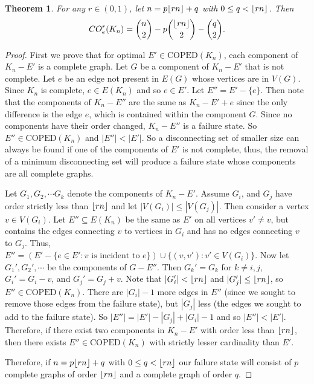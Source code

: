\documentclass[12pt]{article}
\DeclarePairedDelimiter{\floor}{\lfloor}{\rfloor}
\newtheorem{theorem}{Theorem}[section]
\theoremstyle{definition}
\newcommand{\COEDS}{\text{COPED}}
\newcommand{\COE}[2]{CO^{#1}_{e}(#2)}
\begin{document}
\begin{theorem}
For any $r \in (0,1)$, let $n=p\floor{rn}+q$ with $0\leq q < \floor{rn}$. Then
$$\COE{r}{K_{n}}=\binom{n}{2}-p\binom{\floor{rn}}{2} - \binom{q}{2}.$$
\end{theorem}
\begin{proof}

First we prove that for optimal $E'\in \COEDS(K_{n})$, each component of $K_{n}-E'$ is a complete graph. Let $G$ be a component of $K_{n}-E'$ that is not complete. Let $e$ be an edge not present in $E(G)$ whose vertices are in $V(G)$. Since $K_{n}$ is complete, $e\in E(K_{n})$ and so $e\in E'$. Let $E''=E'-\{e\}$. Then note that the components of $K_{n}-E''$ are the same as $K_{n}-E'+e$ since the only difference is the edge $e$, which is contained within the component $G$. Since no components have their order changed, $K_{n}-E''$ is a failure state. So $E''\in \COEDS(K_{n})$ and $|E''|<|E'|$. So a disconnecting set of smaller size can always be found if one of the components of $E'$ is not complete, thus, the removal of a minimum disconnecting set will produce a failure state whose components are all complete graphs. 


Let $G_{1},G_{2},\cdots G_{k}$ denote the components of $K_{n}-E'$. Assume $G_{i}$, and $G_{j}$ have order strictly less than $\floor{rn}$ and let $|V(G_i)|\le |V(G_j)|$. Then consider a vertex $v\in V(G_{i})$. Let $E''\subseteq E(K_{n})$ be the same as $E'$ on all vertices $v'\ne v$, but contains the edges connecting $v$ to vertices in $G_i$ and has no edges connecting $v$ to $G_j$. Thus,\\
$E'' = \left(E'-\{e\in E': v \text{ is incident to } e\}\right) \cup \{(v, v'): v' \in V(G_i)\}$.  Now let $G_1',G_2',\cdots$ be the components of $G-E''$. Then $G_k'=G_k$ for $k\ne i,j$,$G_i' = G_i - v$, and $G_j' = G_j + v$. Note that $|G_{i}'|< \floor{rn}$ and $|G_{j}'|\le \floor{rn}$, so $E''\in \COEDS(K_{n})$.
There are $|G_i|-1$ more edges in $E''$ (since we sought to remove those edges from the failure state), but $|G_j|$ less (the edges we sought to add to the failure state). So $|E''| = |E'|-|G_j|+|G_i|-1$ and so $|E''| < |E'|$. Therefore, if there exist two components in $K_{n}-E'$ with order less than $\floor{rn}$, then there exists $E''\in \COEDS(K_{n})$ with strictly lesser cardinality than $E'$.  



Therefore, if $n=p\floor{rn}+q$ with $0\leq q < \floor{rn}$ our failure state will consist of $p$ complete graphs of order $\floor{rn}$ and a complete graph of order $q$. 
\end{proof}
\end{document}
